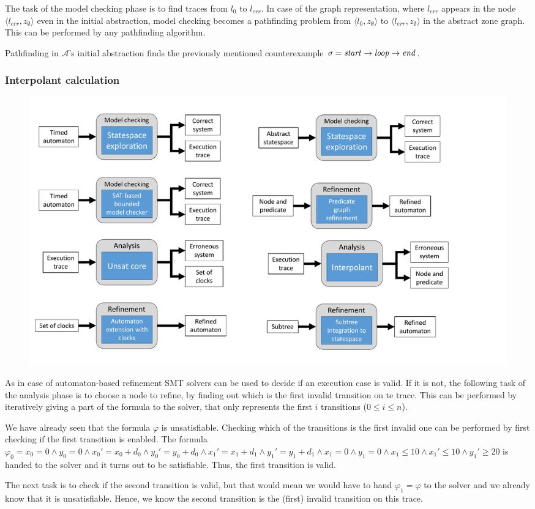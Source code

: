 The task of the model checking phase is to find traces from $l_0$ to $l_{err}$. In case of the graph representation, where $l_{err}$ appears in the node  $\langle l_{err}, z_{\emptyset} \rangle$ even in the initial abstraction, model checking becomes a pathfinding problem from $\langle l_{0}, z_{\emptyset} \rangle$ to $\langle l_{err}, z_{\emptyset} \rangle$ in the abstract zone graph. This can be performed by any pathfinding algorithm.

\begin{runningExample}
	Pathfinding in $\mathcal{A}$'s initial abstraction finds the previously mentioned counterexample $\sigma= \text{\emph{start}} \to \text{\emph{loop}} \to \text{\emph{end}}$.
\end{runningExample}

\subsubsection{Interpolant calculation}

\begin{figure}[h]
	\centering
	\includegraphics[width=.7\textwidth]{include/figures/pred_modules_anal}
\end{figure}

As in case of automaton-based refinement SMT solvers can be used to decide if an execution case is valid. If it is not, the following task of the analysis phase is to choose a node to refine, by finding out which is the first invalid transition on te trace. This can be performed by iteratively giving a part of the formula to the solver, that only represents the first $i$ transitions ($0 \leq i \leq n$).

\begin{runningExample}
	We have already seen that the formula $\varphi$ is unsatisfiable. Checking which of the transitions is the first invalid one can be performed by first checking if the first transition is enabled. The formula $\varphi_0=x_0=0 \wedge y_0=0 \wedge x_0'=x_0+d_0 \wedge y_0'=y_0+d_0 \wedge x_1'=x_1+d_1 \wedge y_1'=y_1+d_1 \wedge x_1=0 \wedge y_1=0 \wedge x_1 \leq 10 \wedge x_1' \leq 10 \wedge y_1' \geq 20$ is handed to the solver and it turns out to be satisfiable. Thus, the first transition is valid.
	
	The next task is to check if the second transition is valid, but that would mean we would have to hand $\varphi_1=\varphi$ to the solver and we already know that it is unsatisfiable. Hence, we know the second transition is the (first) invalid transition on this trace.
\end{runningExample}

